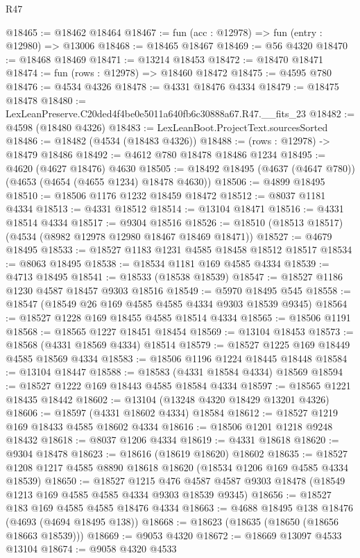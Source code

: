 \begin{lexlean}{R47}
\begin{coremodule}
@18465 := @18462 @18464
@18467 := fun (acc : @12978) => fun (entry : @12980) => @13006
@18468 := @18465 @18467
@18469 := @56 @4320
@18470 := @18468 @18469
@18471 := @13214 @18453
@18472 := @18470 @18471
@18474 := fun (rows : @12978) => @18460 @18472
@18475 := @4595 @780
@18476 := @4534 @4326
@18478 := @4331 @18476 @4334
@18479 := @18475 @18478
@18480 := LexLeanPreserve.C20ded4f4be0e5011a640fb6c30888a67.R47.__fits_23
@18482 := @4598 (@18480 @4326)
@18483 := LexLeanBoot.ProjectText.sourcesSorted
@18486 := @18482 (@4534 (@18483 @4326))
@18488 := (rows : @12978) -> @18479 @18486
@18492 := @4612 @780 @18478 @18486 @1234
@18495 := @4620 (@4627 @18476) @4630
@18505 := @18492 @18495 (@4637 (@4647 @780)) (@4653 (@4654 (@4655 @1234) @18478 @4630))
@18506 := @4899 @18495
@18510 := @18506 @1176 @1232 @18459 @18472
@18512 := @8037 @1181 @4334
@18513 := @4331 @18512
@18514 := @13104 @18471
@18516 := @4331 @18514 @4334
@18517 := @9304 @18516
@18526 := @18510 (@18513 @18517) (@4534 (@8982 @12978 @12980 @18467 @18469 @18471))
@18527 := @4679 @18495
@18533 := @18527 @1183 @1231 @4585 @18458 @18512 @18517
@18534 := @8063 @18495
@18538 := @18534 @1181 @169 @4585 @4334
@18539 := @4713 @18495
@18541 := @18533 (@18538 @18539)
@18547 := @18527 @1186 @1230 @4587 @18457 @9303 @18516
@18549 := @5970 @18495 @545
@18558 := @18547 (@18549 @26 @169 @4585 @4585 @4334 @9303 @18539 @9345)
@18564 := @18527 @1228 @169 @18455 @4585 @18514 @4334
@18565 := @18506 @1191
@18568 := @18565 @1227 @18451 @18454
@18569 := @13104 @18453
@18573 := @18568 (@4331 @18569 @4334) @18514
@18579 := @18527 @1225 @169 @18449 @4585 @18569 @4334
@18583 := @18506 @1196 @1224 @18445 @18448
@18584 := @13104 @18447
@18588 := @18583 (@4331 @18584 @4334) @18569
@18594 := @18527 @1222 @169 @18443 @4585 @18584 @4334
@18597 := @18565 @1221 @18435 @18442
@18602 := @13104 (@13248 @4320 @18429 @13201 @4326)
@18606 := @18597 (@4331 @18602 @4334) @18584
@18612 := @18527 @1219 @169 @18433 @4585 @18602 @4334
@18616 := @18506 @1201 @1218 @9248 @18432
@18618 := @8037 @1206 @4334
@18619 := @4331 @18618
@18620 := @9304 @18478
@18623 := @18616 (@18619 @18620) @18602
@18635 := @18527 @1208 @1217 @4585 @8890 @18618 @18620 (@18534 @1206 @169 @4585 @4334 @18539)
@18650 := @18527
    @1215
    @476
    @4587
    @4587
    @9303
    @18478
    (@18549 @1213 @169 @4585 @4585 @4334 @9303 @18539 @9345)
@18656 := @18527 @183 @169 @4585 @4585 @18476 @4334
@18663 := @4688 @18495 @138 @18476 (@4693 (@4694 @18495 @138))
@18668 := @18623 (@18635 (@18650 (@18656 @18663 @18539)))
@18669 := @9053 @4320
@18672 := @18669 @13097 @4533 @13104
@18674 := @9058 @4320 @4533

\end{coremodule}
\end{lexlean}
